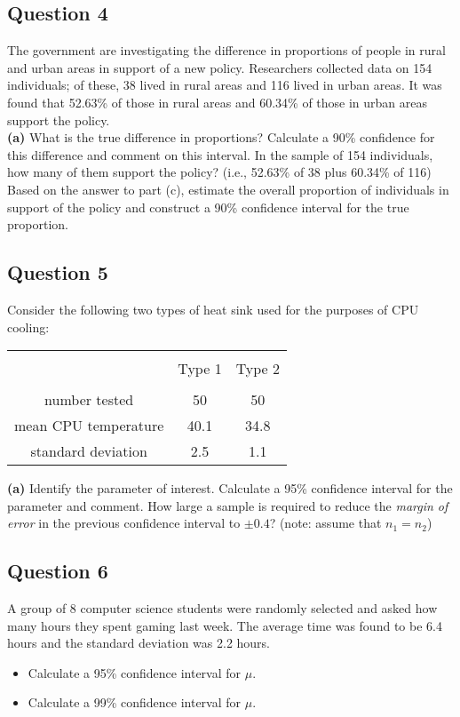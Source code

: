 \documentclass[12pt]{article}
\begin{document}
\subsection*{Question 4}
The government are investigating the difference in proportions of people in rural and urban areas in support of a new policy. Researchers collected data on 154 individuals; of these, 38 lived in rural areas and 116 lived in urban areas. It was found that 52.63\% of those in rural areas and 60.34\% of those in urban areas support the policy.\\[-0.2cm]

{\bf(a)} What is the true difference in proportions?  Calculate a 90\% confidence for this difference and comment on this interval.  In the sample of 154 individuals, how many of them support the policy? (i.e., 52.63\% of 38 plus 60.34\% of 116)  Based on the answer to part (c), estimate the overall proportion of individuals in support of the policy and construct a 90\% confidence interval for the true proportion.




\newpage\subsection*{Question 5}
Consider the following two types of heat sink used for the purposes of CPU cooling:\\[-0.4cm]
\begin{center}
\begin{tabular}{|c|c|c|}
\hline
&&\\[-0.3cm]
& Type 1 & Type 2 \\
\hline
&&\\[-0.3cm]
number tested      & 50 & 50 \\
mean CPU temperature   & 40.1  & 34.8 \\
standard deviation &  2.5 & 1.1 \\[0.1cm]
\hline
\end{tabular}
\end{center}

{\bf(a)} Identify the parameter of interest.  Calculate a 95\% confidence interval for the parameter and comment.  How large a sample is required to reduce the \emph{margin of error} in the previous confidence interval to $\pm 0.4$? (note: assume that $n_1 = n_2$)




\subsection*{Question 6}
A group of 8 computer science students were randomly selected and asked how many hours they spent gaming last week. The average time was found to be 6.4 hours and the standard deviation was 2.2 hours.
\begin{itemize}
\item[{\bf(a)}] Calculate a 95\% confidence interval for $\mu$. \item[{\bf(b)}] Calculate a 99\% confidence interval for $\mu$.
\end{itemize}
\end{document}
